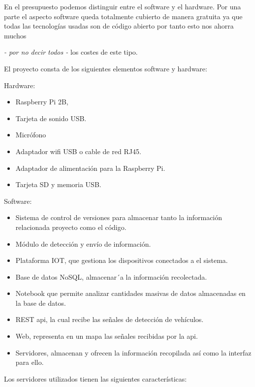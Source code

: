 En el presupuesto podemos distinguir entre el software y el hardware. Por una parte el aspecto software queda totalmente cubierto de manera gratuita ya que todas las tecnologías usadas son de código abierto por tanto esto nos ahorra muchos {\textit{- por no decir todos -} los costes de este tipo.

\bigskip
El proyecto consta de los siguientes elementos software y hardware:

\bigskip
Hardware:
\begin{itemize}
	\item Raspberry Pi 2B,
	\item Tarjeta de sonido USB.
	\item Micrófono
	\item Adaptador wifi USB o cable de red RJ45.
	\item Adaptador de alimentación para la Raspberry Pi.
	\item Tarjeta SD y memoria USB.
\end{itemize}


Software:
\begin{itemize}
	\item Sistema de control de versiones para almacenar tanto la información relacionada proyecto como el código.
	\item Módulo de detección y envío de información.
	\item Plataforma IOT, que gestiona los dispositivos conectados a el sistema.
	\item Base de datos NoSQL, almacenar´a la información recolectada.
	\item Notebook que permite analizar cantidades masivas de datos almacenadas en la base de datos.
	\item REST api, la cual recibe las señales de detección de vehículos.
	\item Web, representa en un mapa las señales recibidas por la api.
	\item Servidores, almacenan y ofrecen la información recopilada así como la interfaz para ello.
\end{itemize}

\newpage

Los servidores utilizados tienen las siguientes características:

}
